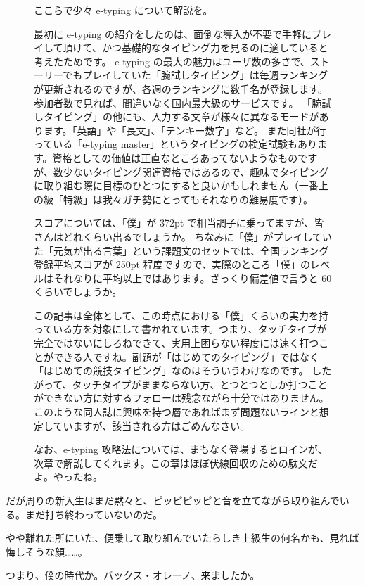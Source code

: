 \begin{figure}
\begin{screen}
ここらで少々 e-typing について解説を。

最初に e-typing の紹介をしたのは、面倒な導入が不要で手軽にプレイして頂けて、かつ基礎的なタイピング力を見るのに適していると考えたためです。
e-typing の最大の魅力はユーザ数の多さで、ストーリーでもプレイしていた「腕試しタイピング」は毎週ランキングが更新されるのですが、各週のランキングに数千名が登録します。参加者数で見れば、間違いなく国内最大級のサービスです。
「腕試しタイピング」の他にも、入力する文章が様々に異なるモードがあります。「英語」や「長文」、「テンキー数字」など。
また同社が行っている「e-typing master」というタイピングの検定試験もあります。資格としての価値は正直なところあってないようなものですが、数少ないタイピング関連資格ではあるので、趣味でタイピングに取り組む際に目標のひとつにすると良いかもしれません（一番上の級「特級」は我々ガチ勢にとってもそれなりの難易度です）。

スコアについては、「僕」が 372pt で相当調子に乗ってますが、皆さんはどれくらい出るでしょうか。
ちなみに「僕」がプレイしていた「元気が出る言葉」という課題文のセットでは、全国ランキング登録平均スコアが 250pt 程度ですので、実際のところ「僕」のレベルはそれなりに平均以上ではあります。ざっくり偏差値で言うと 60 くらいでしょうか。

この記事は全体として、この時点における「僕」くらいの実力を持っている方を対象にして書かれています。つまり、タッチタイプが完全ではないにしろねできて、実用上困らない程度には速く打つことができる人ですね。副題が「はじめてのタイピング」ではなく「はじめての競技タイピング」なのはそういうわけなのです。
したがって、タッチタイプがままならない方、とつとつとしか打つことができない方に対するフォローは残念ながら十分ではありません。このような同人誌に興味を持つ層であればまず問題ないラインと想定していますが、該当される方はごめんなさい。

なお、e-typing 攻略法については、まもなく登場するヒロインが、次章で解説してくれます。この章はほぼ伏線回収のための駄文だよ。やったね。
\end{screen}
\end{figure}

だが周りの新入生はまだ黙々と、ピッピピッピと音を立てながら取り組んでいる。まだ打ち終わっていないのだ。

やや離れた所にいた、便乗して取り組んでいたらしき上級生の何名かも、見れば悔しそうな顔……。

つまり、僕の時代か。パックス・オレーノ、来ましたか。


